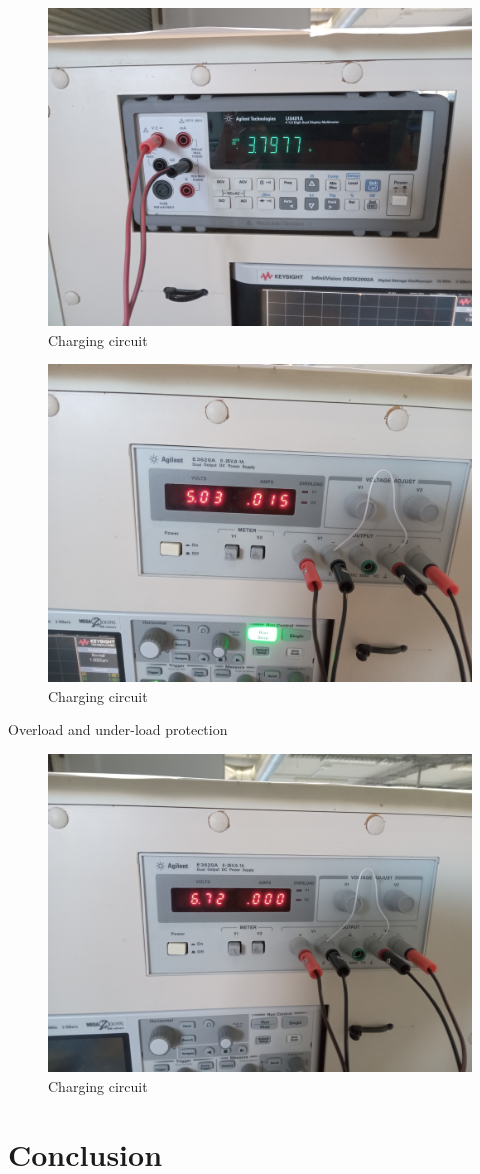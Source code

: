 \documentclass[class=report,11pt,crop=false]{standalone}
\begin{document}
		\begin{figure}[h!]
		\centering
		\includegraphics[width=0.8\linewidth]{Figures/Battey voltageC.jpg}
		\caption{Charging circuit}
		\label{fig: P6}
	\end{figure}
	
	
	\begin{figure}[h!]
	\centering
	\includegraphics[width=0.8\linewidth]{Figures/Overloading current.jpg}
	\caption{Charging circuit}
	\label{fig: P7}
	\end{figure}
	
	
	Overload and under-load protection
	
	\begin{figure}[h!]
		\centering
		\includegraphics[width=0.8\linewidth]{Figures/OverloadAndUnderloadProtection.jpg}
		\caption{Charging circuit}
		\label{fig: P8}
	\end{figure}
	
	\section{Conclusion}
	
\end{document}
